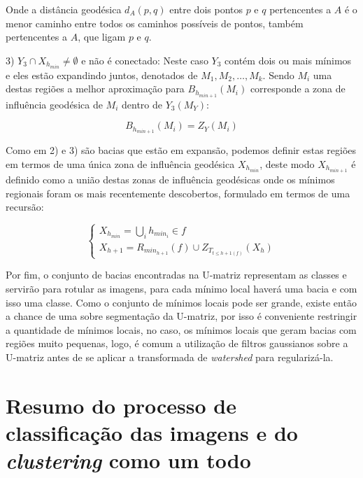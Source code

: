 Onde a distância geodésica $ d_A(p, q) $ entre dois pontos $ p $ e $ q $
pertencentes a $ A $ é o menor caminho entre todos os caminhos possíveis de
pontos, também pertencentes a $ A $, que ligam $ p $ e $ q $.

3) $ Y_3 \cap X_{h_{min}} \neq \emptyset $ e não é conectado: Neste caso $ Y_3 $
contém dois ou mais mínimos e eles estão expandindo juntos, denotados de
$ M_1, M_2, …, M_k $. Sendo $ M_i $ uma destas regiões a melhor aproximação
para $ B_{h_{min + 1}}(M_i) $ corresponde a zona de influência geodésica de $ M_i $
dentro de $ Y_3(M_Y)$:

\begin{equation}\label{eq:watershed_caso3}
  B_{h_{min + 1}}(M_i) = Z_Y(M_i)
\end{equation}

Como em 2) e 3) são bacias que estão em expansão, podemos definir estas regiões em termos
de uma única zona de influência geodésica $ X_{h_{min}} $, deste modo
$ X_{h_{min + 1}} $ é definido como a união destas zonas de influência geodésicas
onde os mínimos regionais foram os mais recentemente descobertos,
formulado em termos de uma recursão:

\begin{equation}\label{eq:watershed_recursao}
  \left\{
    \begin{array}{l}
      X_{h_{min}} = \bigcup_i h_{min_{i}} \in f \\
      X_{h + 1} = R_{min_{h + 1}}(f) \cup Z_{T_{t \le {h + 1}(f)}}(X_h)
    \end{array}
  \right.
\end{equation}

Por fim, o conjunto de bacias encontradas na U-matriz representam as classes e
servirão para rotular as imagens, para cada mínimo local haverá uma bacia e com
isso uma classe. Como o conjunto de mínimos locais pode ser grande, existe então
a chance de uma sobre segmentação da U-matriz, por isso é conveniente restringir
a quantidade de mínimos locais, no caso, os mínimos locais que geram bacias
com regiões muito pequenas, logo, é comum a utilização de filtros gaussianos
sobre a U-matriz antes de se aplicar a transformada de \textit{watershed} para
regularizá-la.

\section{Resumo do processo de classificação das imagens e do \textit{clustering}
como um todo}\label{sec:resumo_clustering}

